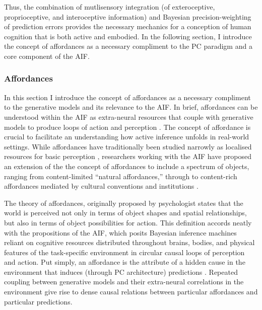 \begin{CJK}{UTF8}{gbsn}
Thus, the combination of mutlisensory integration (of exteroceptive, proprioceptive, and interoceptive information) and Bayesian precision-weighting of prediction errors provides the necessary mechanics for a conception of human cognition that is both active and embodied.    In the following section, I introduce the concept of affordances as a necessary compliment to the PC paradigm and a core component of the AIF.





\subsubsection{Affordances}
In this section I introduce the concept of affordances as a necessary compliment to the generative models and its relevance to the AIF.  In brief, affordances can be understood within the AIF as extra-neural resources that couple with generative models to produce loops of action and perception \citep{Ramstead2016,Clark2015}.  The concept of affordance is crucial to facilitate an understanding how active inference unfolds in real-world settings.  While affordances have traditionally been studied narrowly as localised resources for basic perception \citep[e.g.][]{Fajen2011}, researchers working with the AIF have proposed an extension of the the concept of affordances to include a spectrum of objects, ranging from content-limited ``natural affordances,'' through to content-rich affordances mediated by cultural conventions and institutions \citep[cf.][]{Roepstorff2010,Ramstead2016}.

The theory of affordances, originally proposed by psychologist \textcite{Gibson1979} states that the world is perceived not only in terms of object shapes and spatial relationships, but also in terms of object possibilities for action.  This definition accords neatly with the propositions of the AIF, which posits Bayesian inference machines reliant on cognitive resources distributed throughout brains, bodies, and physical features of the task-specific environment in circular causal loops of perception and action.  Put simply, an affordance is the attribute of a hidden cause in the environment that induces (through PC architecture) predictions \citep[908]{Pezzulo2013}.  Repeated coupling between generative models and their extra-neural correlations in the environment give rise to dense causal relations between particular affordances and particular predictions.


\end{CJK}
